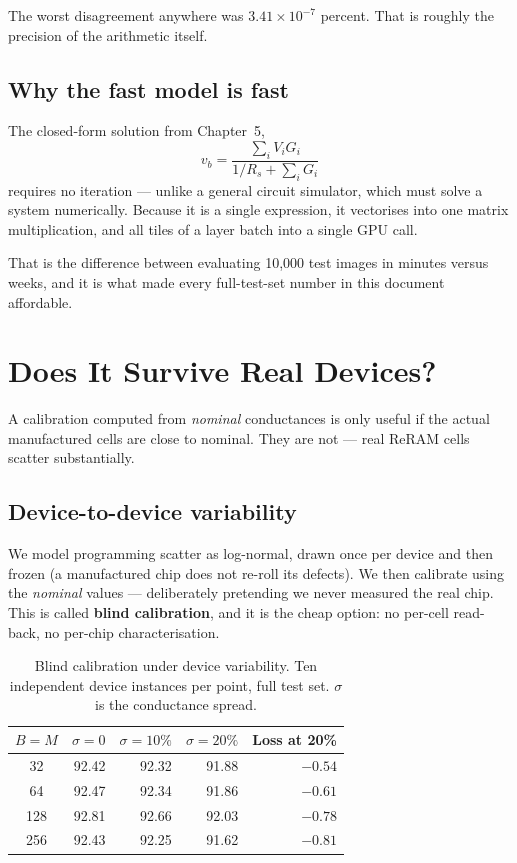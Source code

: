 \documentclass[11pt,a4paper]{report}
\newcommand{\jargon}[1]{\textcolor{acc}{\textbf{#1}}}
\begin{document}
The worst disagreement anywhere was $3.41\times10^{-7}$ percent. That is
roughly the precision of the arithmetic itself.

\section{Why the fast model is fast}

The closed-form solution from Chapter~5,
\[
v_b = \frac{\sum_i V_i G_i}{1/R_s + \sum_i G_i}
\]
requires no iteration --- unlike a general circuit simulator, which must solve
a system numerically. Because it is a single expression, it vectorises into
one matrix multiplication, and all tiles of a layer batch into a single GPU
call.

That is the difference between evaluating 10{,}000 test images in minutes
versus weeks, and it is what made every full-test-set number in this document
affordable.

\chapter{Does It Survive Real Devices?}

A calibration computed from \emph{nominal} conductances is only useful if the
actual manufactured cells are close to nominal. They are not --- real ReRAM
cells scatter substantially.

\section{Device-to-device variability}

We model programming scatter as log-normal, drawn once per device and then
frozen (a manufactured chip does not re-roll its defects). We then calibrate
using the \emph{nominal} values --- deliberately pretending we never measured
the real chip. This is called \jargon{blind calibration}, and it is the cheap
option: no per-cell read-back, no per-chip characterisation.

\begin{table}[h]
\centering
\caption{Blind calibration under device variability. Ten independent device
instances per point, full test set. $\sigma$ is the conductance spread.}
\begin{tabular}{crrrr}
\toprule
$B = M$ & $\sigma = 0$ & $\sigma = 10\%$ & $\sigma = 20\%$ & Loss at 20\% \\
\midrule
32  & 92.42 & 92.32 & 91.88 & $-0.54$ \\
64  & 92.47 & 92.34 & 91.86 & $-0.61$ \\
128 & 92.81 & 92.66 & 92.03 & $-0.78$ \\
256 & 92.43 & 92.25 & 91.62 & $-0.81$ \\
\bottomrule
\end{tabular}
\end{table}
\end{document}
